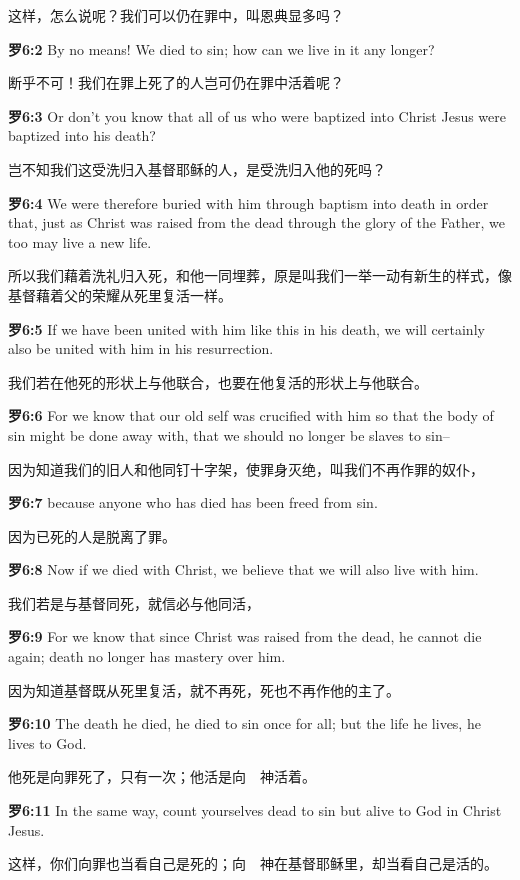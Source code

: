 \documentclass[a4paper,11pt,onecolumn,twoside]{ctexart}
\begin{document}
\begin{multicols}{2}
 这样，怎么说呢？我们可以仍在罪中，叫恩典显多吗？


\textbf{ 罗6:2}
 By no means! We died to sin; how can we live in it any longer?

 断乎不可！我们在罪上死了的人岂可仍在罪中活着呢？


 \textbf{罗6:3}
 Or don't you know that all of us who were baptized into Christ Jesus were baptized into his death?

 岂不知我们这受洗归入基督耶稣的人，是受洗归入他的死吗？


 \textbf{罗6:4}
 We were therefore buried with him through baptism into death in order that, just as Christ was raised from the dead through the glory of the Father, we too may live a new life.

 所以我们藉着洗礼归入死，和他一同埋葬，原是叫我们一举一动有新生的样式，像基督藉着父的荣耀从死里复活一样。


 \textbf{罗6:5}
 If we have been united with him like this in his death, we will certainly also be united with him in his resurrection.

 我们若在他死的形状上与他联合，也要在他复活的形状上与他联合。


 \textbf{罗6:6}
 For we know that our old self was crucified with him so that the body of sin might be done away with, that we should no longer be slaves to sin--

 因为知道我们的旧人和他同钉十字架，使罪身灭绝，叫我们不再作罪的奴仆，


 \textbf{罗6:7}
 because anyone who has died has been freed from sin.

 因为已死的人是脱离了罪。


 \textbf{罗6:8}
 Now if we died with Christ, we believe that we will also live with him.

 我们若是与基督同死，就信必与他同活，


 \textbf{罗6:9}
 For we know that since Christ was raised from the dead, he cannot die again; death no longer has mastery over him.

 因为知道基督既从死里复活，就不再死，死也不再作他的主了。


 \textbf{罗6:10}
 The death he died, he died to sin once for all; but the life he lives, he lives to God.

 他死是向罪死了，只有一次；他活是向　神活着。


 \textbf{罗6:11}
 In the same way, count yourselves dead to sin but alive to God in Christ Jesus.

 这样，你们向罪也当看自己是死的；向　神在基督耶稣里，却当看自己是活的。



\end{multicols}
\end{document}
